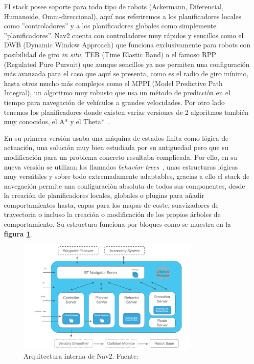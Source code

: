 El stack posee soporte para todo tipo de robots (Ackermann, Diferencial, Humanoide, Omni-direccional), aquí nos referiremos a los planificadores locales
como ''controladores'' y a los planificadores globales como simplemente ''planificadores''. Nav2 cuenta con controladores muy rápidos y 
sencillos como el DWB (Dynamic Window Approach) que funciona exclusivamente para robots con posibilidad de giro \textit{in situ}, TEB 
(Time Elastic Band) o el famoso RPP (Regulated Pure Pursuit) que aunque sencillos ya nos permiten una configuración más avanzada
para el caso que aquí se presenta, como es el radio de giro mínimo, hasta otros mucho más complejos como el MPPI (Model Predictive Path Integral), un algoritmo 
muy robusto que usa un método de predicción en el tiempo para navegación de vehículos a grandes velocidades. Por otro lado tenemos los 
planificadores donde existen varias versiones de 2 algoritmos también muy conocidos, el A* y el Theta*~\cite{sun2023path}.

En su primera versión usaba una máquina de estados finita como lógica de actuación, una solución muy bien estudiada por su antigüedad
pero que su modificación para un problema concreto resultaba complicada. Por ello, en su nueva versión se utilizan los llamados 
\textit{behavior trees}~\cite{colledanchise2018behavior}, unas estructuras lógicas muy versátiles y sobre todo extremadamente adaptables, 
gracias a ello el stack de navegación permite una configuración absoluta de todos sus componentes, desde la creación de planificadores locales, globales o
plugins para añadir comportamientos hasta, capas para los mapas de coste, suavizadores de trayectoria o incluso la creación o modificación de los 
propios árboles de comportamiento. Su estructura funciona por bloques como se muestra en la  \textbf{figura \ref{fig:nav2_arch}}.
\begin{figure}[h]
    \centering
    \includegraphics[width=0.8\textwidth]{images/nav2_architecture.png}
    \caption{Arquitectura interna de Nav2. Fuente:~\cite{nav2}}
    \label{fig:nav2_arch}
\end{figure}
\newpage
